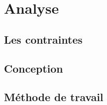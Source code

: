 \part{Analyse}

\clearemptydoublepage
\chapter{Les contraintes}
\label{chapter:les_contraintes}
\minitoc



\clearemptydoublepage
\chapter{Conception}
\minitoc




\clearemptydoublepage
\chapter{Méthode de travail}
\minitoc

